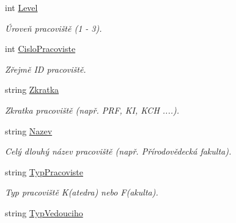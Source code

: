 \begin{DoxyCompactItemize}
\item 
int \hyperlink{class_analyza_rozvrhu_1_1_s_t_a_g___classes_1_1_pracoviste_ad32d0a82adad6f2a215ebb0010750075}{Level}
\begin{DoxyCompactList}\small\item\em Úroveň pracoviště (1 -\/ 3). \end{DoxyCompactList}\item 
int \hyperlink{class_analyza_rozvrhu_1_1_s_t_a_g___classes_1_1_pracoviste_ade32248db7e2c1e7a7a97c57cad95f75}{Cislo\+Pracoviste}
\begin{DoxyCompactList}\small\item\em Zřejmě ID pracoviště. \end{DoxyCompactList}\item 
string \hyperlink{class_analyza_rozvrhu_1_1_s_t_a_g___classes_1_1_pracoviste_a76e26d6a2ae6a79c368e43822cfef762}{Zkratka}
\begin{DoxyCompactList}\small\item\em Zkratka pracoviště (např. P\+RF, KI, K\+CH ....). \end{DoxyCompactList}\item 
string \hyperlink{class_analyza_rozvrhu_1_1_s_t_a_g___classes_1_1_pracoviste_a49fda1e125661a498fa5072e6b1ff41a}{Nazev}
\begin{DoxyCompactList}\small\item\em Celý dlouhý název pracoviště (např. Přírodovědecká fakulta). \end{DoxyCompactList}\item 
string \hyperlink{class_analyza_rozvrhu_1_1_s_t_a_g___classes_1_1_pracoviste_a64ec801fcc8696ba32a348bed7b8be04}{Typ\+Pracoviste}
\begin{DoxyCompactList}\small\item\em Typ pracoviště K(atedra) nebo F(akulta). \end{DoxyCompactList}\item 
string \hyperlink{class_analyza_rozvrhu_1_1_s_t_a_g___classes_1_1_pracoviste_a2c340cbe9d8d0fa7dcbde393381ddfcb}{Typ\+Vedouciho}

\end{DoxyCompactItemize}
